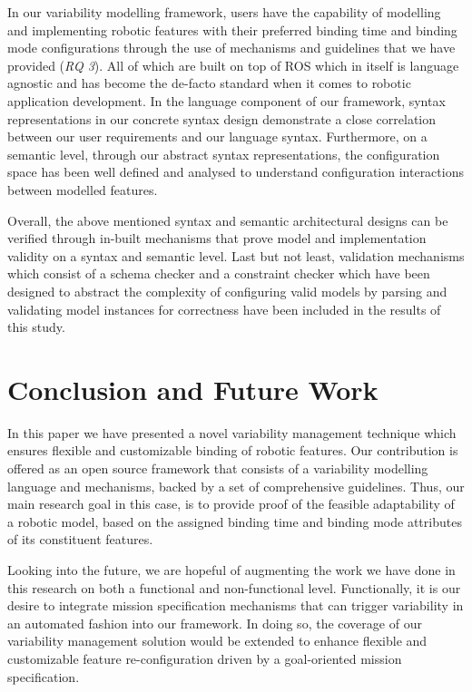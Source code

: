 \documentclass[conference]{IEEEtran}
\begin{document}
In our variability modelling framework, users have the capability of modelling and implementing robotic features with their preferred binding time and binding mode configurations through the use of mechanisms and guidelines that we have provided (\textit{RQ 3}). All of which are built on top of ROS which in itself is language agnostic and has become the de-facto standard when it comes to robotic application development. In the language component of our framework, syntax representations in our concrete syntax design demonstrate a close correlation between our user requirements and our language syntax. Furthermore, on a semantic level, through our abstract syntax representations, the configuration space has been well defined and analysed to understand configuration interactions between modelled features.

Overall, the above mentioned syntax and semantic architectural designs can be verified through in-built mechanisms that prove model and implementation validity on a syntax and semantic level. Last but not least, validation mechanisms which consist of a schema checker and a constraint checker which have been designed to abstract the complexity of configuring valid models by parsing and validating model instances for correctness have been included in the results of this study.

\section{Conclusion and Future Work}
In this paper we have presented a novel variability management technique which ensures flexible and customizable binding of robotic features. Our contribution is offered as an open source framework that consists of a variability modelling language and mechanisms, backed by a set of comprehensive guidelines. Thus, our main research goal in this case, is to provide proof of the feasible adaptability of a robotic model, based on the assigned binding time and binding mode attributes of its constituent features. 

Looking into the future, we are hopeful of augmenting the work we have done in this research on both a functional and non-functional level. Functionally, it is our desire to integrate mission specification mechanisms that can trigger variability in an automated fashion into our framework. In doing so, the coverage of our variability management solution would be extended to enhance flexible and customizable feature re-configuration driven by a goal-oriented mission specification.
\end{document}
